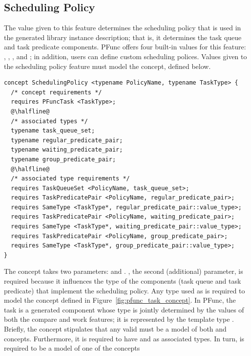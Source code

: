 \subsection{Scheduling Policy}
\label{subsec:scheduling_policy}

The value given to this feature determines the scheduling policy that is
used in the generated library instance description; that is, it determines the
task queue and task predicate components.
%
PFunc offers four built-in values for this feature: , ,
, and ; in addition, users can define custom scheduling
polices.
%
Values given to the scheduling policy feature must model the
 concept, defined below.
%
\begin{lstlisting}
concept SchedulingPolicy <typename PolicyName, typename TaskType> {
  /* concept requirements */
  requires PFuncTask <TaskType>;
  @\halfline@
  /* associated types */
  typename task_queue_set;
  typename regular_predicate_pair;
  typename waiting_predicate_pair;
  typename group_predicate_pair;
  @\halfline@
  /* associated type requirements */
  requires TaskQueueSet <PolicyName, task_queue_set>;
  requires TaskPredicatePair <PolicyName, regular_predicate_pair>;
  requires SameType <TaskType*, regular_predicate_pair::value_type>;
  requires TaskPredicatePair <PolicyName, waiting_predicate_pair>;
  requires SameType <TaskType*, waiting_predicate_pair::value_type>;
  requires TaskPredicatePair <PolicyName, group_predicate_pair>;
  requires SameType <TaskType*, group_predicate_pair::value_type>;
}
\end{lstlisting}
%
The  concept takes two parameters: 
and .
%
, the second (additional) parameter, is required because it
influences the type of the components (task queue and task predicate) that
implement the scheduling policy.
%
Any type used as  is required to model the 
concept defined in Figure~\ref{fig:pfunc_task_concept}.
%
In PFunc, the task is a generated component whose type is jointly determined by
the values of both the compare and work features; it is represented by the
template type .
%
Briefly, the  concept stipulates that any valid
 must be a model of both  and
 concepts.
%
Furthermore, it is required to have  and 
as associated types.
%
In turn,  is required to be a model of one of the concepts
